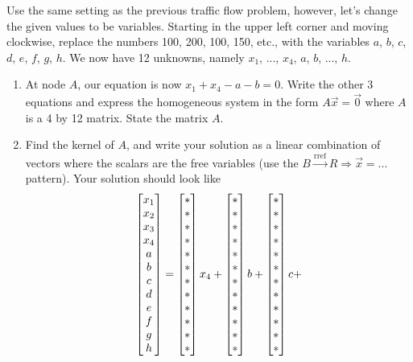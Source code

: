 \begin{problem}
Use the same setting as the previous traffic flow problem, however, let's change the given values to be variables.  Starting in the upper left corner and moving clockwise, replace the numbers 100, 200, 100, 150, etc., with the variables $a$, $b$, $c$, $d$, $e$, $f$, $g$, $h$. We now have 12 unknowns, namely $x_1$, ..., $x_4$, $a$, $b$, ..., $h$. 
\begin{enumerate}
 \item  At node $A$, our equation is now $x_1+x_4-a-b=0$. Write the other 3 equations and express the homogeneous system in the form $A\vec x = \vec 0$ where $A$ is a 4 by 12 matrix.  State the matrix $A$.
 \item Find the kernel of $A$, and write your solution as a linear combination of vectors where the scalars are the free variables (use the $B\xrightarrow{\text{rref}}R\Rightarrow\vec x = ...$ pattern). Your solution should look like 
$$
\begin{bmatrix} x_1\\ x_2 \\ x_3\\ x_4\\a\\b\\c\\d\\e\\f\\g\\h \end{bmatrix}=
\begin{bmatrix} *\\ *\\ *\\ *\\ *\\ *\\ *\\ *\\ *\\ *\\ *\\ * \end{bmatrix}x_4+
\begin{bmatrix} *\\ *\\ *\\ *\\ *\\ *\\ *\\ *\\ *\\ *\\ *\\ * \end{bmatrix}b+
\begin{bmatrix} *\\ *\\ *\\ *\\ *\\ *\\ *\\ *\\ *\\ *\\ *\\ * \end{bmatrix}c+
$$
\end{enumerate}
\end{problem}
